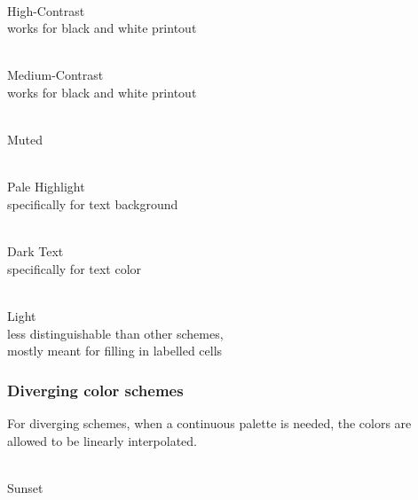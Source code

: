 \documentclass{scrartcl}
\begin{document}
\begin{minipage}{0.5\textwidth}
    \centering
    \\
    High-Contrast\\
    works for black and white printout
\end{minipage}\hfill%
\begin{minipage}{0.5\textwidth}
    \centering
    \\
    Medium-Contrast\\
    works for black and white printout
\end{minipage}

\begin{center}
    \\
    Muted
\end{center}

\begin{minipage}{0.5\textwidth}
    \centering
    \\
    Pale Highlight\\
    specifically for text background
\end{minipage}\hfill%
\begin{minipage}{0.5\textwidth}
    \centering
    \\
    Dark Text\\
    specifically for text color
\end{minipage}

\begin{center}
    \\
    Light\\
    less distinguishable than other schemes,\\ mostly meant for filling in labelled cells
\end{center}

\subsubsection{Diverging color schemes}\label{sec:T-D}
For diverging schemes, when a continuous palette is needed, the colors are allowed to be linearly interpolated.

\begin{center}
    \\
    Sunset
\end{center}
\end{document}
